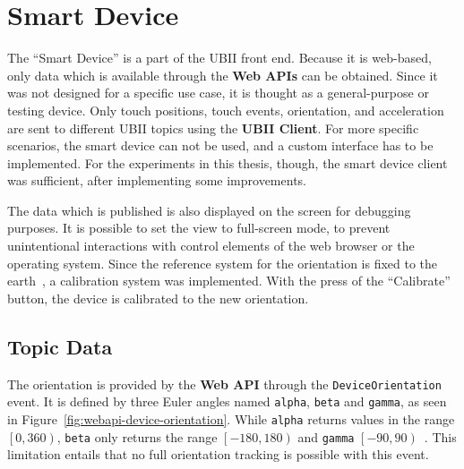 \section{Smart Device}\label{section:smart-device}

The \enquote{Smart Device} is a part of the \ac{UBII} front end. Because it is web-based, only data which is available through the \textbf{Web \acp{API}} can be obtained. Since it was not designed for a specific use case, it is thought as a general-purpose or testing device. Only touch positions, touch events, orientation, and acceleration are sent to different \ac{UBII} topics using the \textbf{\ac{UBII} Client}. For more specific scenarios, the smart device can not be used, and a custom interface has to be implemented. For the experiments in this thesis, though, the smart device client was sufficient, after implementing some improvements.

The data which is published is also displayed on the screen for debugging purposes. It is possible to set the view to full-screen mode, to prevent unintentional interactions with control elements of the web browser or the operating system. Since the reference system for the orientation is fixed to the earth~\cite[Chapter~4.1]{DevicesandSensorsWorkingGroup.2019}, a calibration system was implemented. With the press of the \enquote{Calibrate} button, the device is calibrated to the new orientation.


\subsection{Topic Data}\label{subsection:topic-data}

The orientation is provided by the \textbf{Web API} through the \lstinline{DeviceOrientation} event. It is defined by three Euler angles named \lstinline{alpha}, \lstinline{beta} and \lstinline{gamma}, as seen in Figure~\ref{fig:webapi-device-orientation}.
While \lstinline{alpha} returns values in the range \(\left[0, 360\right)\), \lstinline{beta} only returns the range \(\left[-180, 180\right)\) and \lstinline{gamma} \(\left[-90, 90\right)\)~\cite[Chapter~4.1]{DevicesandSensorsWorkingGroup.2019}. %
This limitation entails that no full orientation tracking is possible with this event. 

